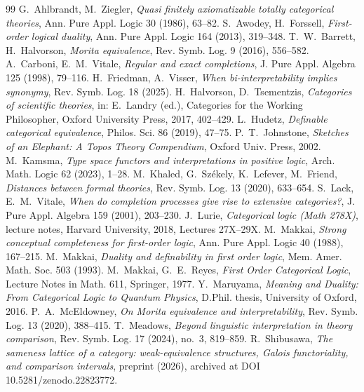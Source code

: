 \documentclass[11pt]{amsart}
\theoremstyle{definition}
\begin{document}
\begin{thebibliography}{99}
 G.~Ahlbrandt, M.~Ziegler, \emph{Quasi finitely axiomatizable
totally categorical theories}, Ann. Pure Appl. Logic 30 (1986), 63--82.
 S.~Awodey, H.~Forssell, \emph{First-order logical duality},
Ann. Pure Appl. Logic 164 (2013), 319--348.
 T.~W.~Barrett, H.~Halvorson, \emph{Morita equivalence},
Rev. Symb. Log. 9 (2016), 556--582.
 A.~Carboni, E.~M.~Vitale, \emph{Regular and exact
completions}, J. Pure Appl. Algebra 125 (1998), 79--116.
 H.~Friedman, A.~Visser, \emph{When bi-interpretability
implies synonymy}, Rev. Symb. Log. 18 (2025).
 H.~Halvorson, D.~Tsementzis, \emph{Categories of
scientific theories}, in: E.~Landry (ed.), Categories for the Working
Philosopher, Oxford University Press, 2017, 402--429.
 L.~Hudetz, \emph{Definable categorical equivalence},
Philos. Sci. 86 (2019), 47--75.
 P.~T.~Johnstone, \emph{Sketches of an Elephant: A Topos
Theory Compendium}, Oxford Univ. Press, 2002.
 M.~Kamsma, \emph{Type space functors and
interpretations in positive logic}, Arch. Math. Logic 62 (2023), 1--28.
 M.~Khaled, G.~Sz\'ekely, K.~Lefever, M.~Friend,
\emph{Distances between formal theories}, Rev. Symb. Log. 13 (2020),
633--654.
 S.~Lack, E.~M.~Vitale, \emph{When do completion processes
give rise to extensive categories?}, J. Pure Appl. Algebra 159 (2001),
203--230.
 J.~Lurie, \emph{Categorical logic (Math 278X)},
lecture notes, Harvard University, 2018, Lectures 27X--29X.
 M.~Makkai, \emph{Strong conceptual completeness for
first-order logic}, Ann. Pure Appl. Logic 40 (1988), 167--215.
 M.~Makkai, \emph{Duality and definability in first
order logic}, Mem. Amer. Math. Soc. 503 (1993).
 M.~Makkai, G.~E.~Reyes, \emph{First Order Categorical
Logic}, Lecture Notes in Math. 611, Springer, 1977.
 Y.~Maruyama, \emph{Meaning and Duality: From
Categorical Logic to Quantum Physics}, D.Phil. thesis, University of
Oxford, 2016.
 P.~A.~McEldowney, \emph{On Morita equivalence and
interpretability}, Rev. Symb. Log. 13 (2020), 388--415.
 T.~Meadows, \emph{Beyond linguistic interpretation in
theory comparison}, Rev. Symb. Log. 17 (2024), no.~3, 819--859.
 R.~Shibusawa, \emph{The sameness lattice of a category:
weak-equivalence structures, Galois functoriality, and comparison intervals},
preprint (2026), archived at DOI 10.5281/zenodo.22823772.

\end{thebibliography}
\end{document}
